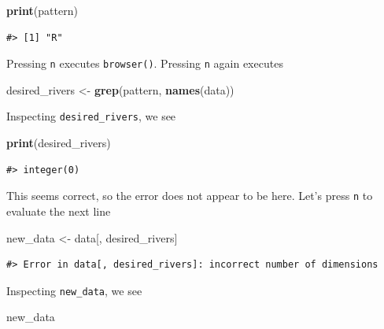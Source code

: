 \documentclass[
]{book}
\newenvironment{Shaded}{\begin{snugshade}}{\end{snugshade}}
\newcommand{\KeywordTok}[1]{\textcolor[rgb]{0.13,0.29,0.53}{\textbf{#1}}}
\newcommand{\NormalTok}[1]{#1}
\newcommand{\StringTok}[1]{\textcolor[rgb]{0.31,0.60,0.02}{#1}}
\begin{document}
\begin{Shaded}
\begin{Highlighting}[]
\KeywordTok{print}\NormalTok{(pattern)}
\end{Highlighting}
\end{Shaded}

\begin{verbatim}
#> [1] "R"
\end{verbatim}

Pressing \texttt{n} executes \texttt{browser()}. Pressing \texttt{n} again executes

\begin{Shaded}
\begin{Highlighting}[]
\NormalTok{desired_rivers <-}\StringTok{ }\KeywordTok{grep}\NormalTok{(pattern, }\KeywordTok{names}\NormalTok{(data))}
\end{Highlighting}
\end{Shaded}

Inspecting \texttt{desired\_rivers}, we see

\begin{Shaded}
\begin{Highlighting}[]
\KeywordTok{print}\NormalTok{(desired_rivers)}
\end{Highlighting}
\end{Shaded}

\begin{verbatim}
#> integer(0)
\end{verbatim}

This seems correct, so the error does not appear to be here. Let's press \texttt{n} to evaluate the next line

\begin{Shaded}
\begin{Highlighting}[]
\NormalTok{new_data <-}\StringTok{ }\NormalTok{data[, desired_rivers]}
\end{Highlighting}
\end{Shaded}

\begin{verbatim}
#> Error in data[, desired_rivers]: incorrect number of dimensions
\end{verbatim}

Inspecting \texttt{new\_data}, we see

\begin{Shaded}
\begin{Highlighting}[]
\NormalTok{new_data}
\end{Highlighting}
\end{Shaded}
\end{document}
